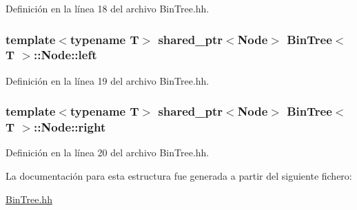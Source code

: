 Definición en la línea 18 del archivo Bin\+Tree.\+hh.

\subsubsection[{\texorpdfstring{left}{left}}]{\setlength{\rightskip}{0pt plus 5cm}template$<$typename T$>$ shared\+\_\+ptr$<${\bf Node}$>$ {\bf Bin\+Tree}$<$ T $>$\+::Node\+::left}\hypertarget{struct_bin_tree_1_1_node_a265a6367635a38838e6a6366564be78d}{}\label{struct_bin_tree_1_1_node_a265a6367635a38838e6a6366564be78d}


Definición en la línea 19 del archivo Bin\+Tree.\+hh.

\subsubsection[{\texorpdfstring{right}{right}}]{\setlength{\rightskip}{0pt plus 5cm}template$<$typename T$>$ shared\+\_\+ptr$<${\bf Node}$>$ {\bf Bin\+Tree}$<$ T $>$\+::Node\+::right}\hypertarget{struct_bin_tree_1_1_node_a6df770137090da60cd0376ce06893cbd}{}\label{struct_bin_tree_1_1_node_a6df770137090da60cd0376ce06893cbd}


Definición en la línea 20 del archivo Bin\+Tree.\+hh.



La documentación para esta estructura fue generada a partir del siguiente fichero\+:\begin{DoxyCompactItemize}
\item 
\hyperlink{_bin_tree_8hh}{Bin\+Tree.\+hh}\end{DoxyCompactItemize}
